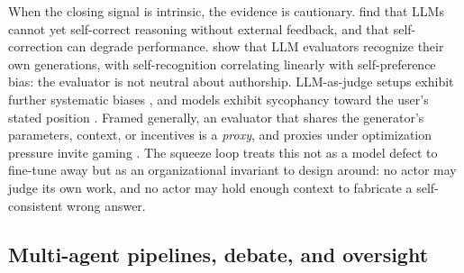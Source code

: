 \documentclass[11pt]{article}
\begin{document}
When the closing signal is intrinsic, the evidence is cautionary. \citet{huang2023cannot} find
that LLMs cannot yet self-correct reasoning without external feedback, and that self-correction
can degrade performance. \citet{panickssery2024llm} show that LLM evaluators recognize their own
generations, with self-recognition correlating linearly with self-preference bias: the evaluator
is not neutral about authorship. LLM-as-judge setups exhibit further systematic biases
\citep{zheng2023judging}, and models exhibit sycophancy toward the user's stated position
\citep{sharma2023sycophancy}. Framed generally, an evaluator that shares the generator's
parameters, context, or incentives is a \emph{proxy}, and proxies under optimization pressure
invite gaming \citep{manheim2018goodhart,krakovna2020specification,amodei2016concrete}. The
squeeze loop treats this not as a model defect to fine-tune away but as an organizational
invariant to design around: no actor may judge its own work, and no actor may hold enough context
to fabricate a self-consistent wrong answer.

\subsection{Multi-agent pipelines, debate, and oversight}
\end{document}
